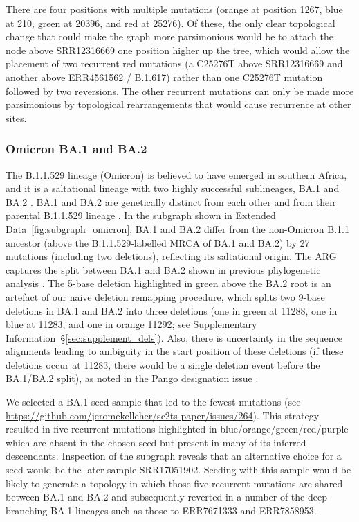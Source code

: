 \documentclass[12pt]{article}
\newcommand{\supref}[1]{Supplementary Information~\S\ref{#1}}
\newcommand{\edref}[1]{Extended Data~\ref{#1}}
\begin{document}
There are four positions with multiple mutations
(orange at position 1267, blue at 210, green at 20396, and red at 25276).
Of these, the only clear topological change
that could make the graph more parsimonious would be
to attach the node above SRR12316669 one position higher up the tree,
which would allow the placement of two recurrent red mutations
(a C25276T above SRR12316669 and another above ERR4561562 / B.1.617)
rather than one C25276T mutation followed by two reversions.
The other recurrent mutations can only be made more parsimonious
by topological rearrangements that would cause recurrence at other sites.


\subsubsection{Omicron BA.1 and BA.2}
\label{sec:dd_omicron}

The B.1.1.529 lineage (Omicron)
is believed to have emerged in southern Africa, and
it is a saltational lineage with two highly successful sublineages,
BA.1 and BA.2 \cite{Dor2025}.
BA.1 and BA.2 are genetically distinct from each other and
from their parental B.1.1.529 lineage \cite{RambautOmicron2021}.
In the subgraph shown in \edref{fig:subgraph_omicron},
BA.1 and BA.2 differ from the non-Omicron B.1.1 ancestor
(above the B.1.1.529-labelled MRCA of BA.1 and BA.2)
by 27 mutations (including two deletions),
reflecting its saltational origin.
The ARG captures the split between BA.1 and BA.2
shown in previous phylogenetic analysis \cite{Dor2025}.
The 5-base deletion highlighted in green above the BA.2 root
is an artefact of our naive deletion remapping procedure,
which splits two 9-base deletions in BA.1 and BA.2 into three deletions
(one in green at 11288, one in blue at 11283, and one in orange 11292;
see \supref{sec:supplement_dels}).
Also, there is uncertainty in the sequence alignments
leading to ambiguity in the start position of these deletions
(if these deletions occur at 11283,
there would be a single deletion event before the BA.1/BA.2 split),
as noted in the Pango designation issue \cite{RambautOmicron2021}.

We selected a BA.1 seed sample that led to the fewest mutations (see \url{https://github.com/jeromekelleher/sc2ts-paper/issues/264}).
This strategy resulted in five recurrent mutations
highlighted in blue/orange/green/red/purple
which are absent in the chosen seed
but present in many of its inferred descendants.
Inspection of the subgraph reveals that an alternative choice for a seed would be the later sample SRR17051902. Seeding with this sample would be likely to generate a topology
in which those five recurrent mutations are shared between BA.1 and BA.2 and subsequently reverted in a number of the deep branching BA.1 lineages such as those to ERR7671333 and ERR7858953.
\end{document}
